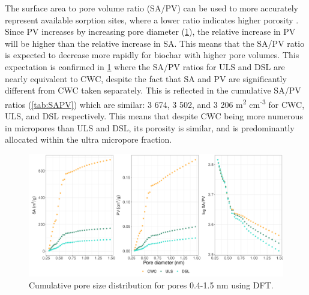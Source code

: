 The surface area to pore volume ratio (SA/PV) can be used to more accurately represent available sorption sites, where a lower ratio indicates higher porosity \citep{presser2011SAPV}. Since PV increases by increasing pore diameter (\cref{fig:PZD_small}), the relative increase in PV will be higher than the relative increase in SA. This means that the SA/PV ratio is expected to decrease more rapidly for biochar with higher pore volumes. This expectation is confirmed in \cref{fig:PZD_small} where the SA/PV ratios for ULS and DSL are nearly equivalent to CWC, despite the fact that SA and PV are significantly different from CWC taken separately. This is reflected in the cumulative SA/PV ratios (\cref{tab:SAPV}) which are similar: 3 674, 3 502, and 3 206 m\textsuperscript{2} cm\textsuperscript{-3} for CWC, ULS, and DSL respectively. This means that despite CWC being more numerous in micropores than ULS and DSL, its porosity is similar, and is predominantly allocated within the ultra micropore fraction.

\begin{figure}[htb]
    \centering
    \includegraphics[width=\textwidth]{R/figs/PZD_SAPV_C_small_plot.pdf}
    \caption{Cumulative pore size distribution for pores 0.4-1.5 nm using DFT.}
    \label{fig:PZD_small}
\end{figure}

